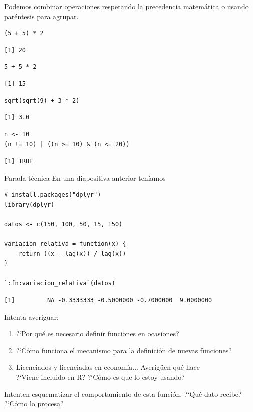 \documentclass[8pt]{beamer}
\begin{document}
\begin{frame}[fragile]
	Podemos combinar operaciones respetando la precedencia matemática o usando paréntesis para agrupar.
	
\begin{lstlisting}[style=RScript]
(5 + 5) * 2
\end{lstlisting}
\begin{lstlisting}[style=RConsole]
[1] 20
\end{lstlisting}
\begin{lstlisting}[style=RScript]
5 + 5 * 2
\end{lstlisting}
\begin{lstlisting}[style=RConsole]
[1] 15
\end{lstlisting}
\begin{lstlisting}[style=RScript]
sqrt(sqrt(9) + 3 * 2)
\end{lstlisting}
\begin{lstlisting}[style=RConsole]
[1] 3.0
\end{lstlisting}
\begin{lstlisting}[style=RScript]
n <- 10
(n != 10) | ((n >= 10) & (n <= 20))
\end{lstlisting}
\begin{lstlisting}[style=RConsole]
[1] TRUE
\end{lstlisting}
\end{frame}






	\begin{frame}[fragile]{Parada t\'ecnica}
	En una diapositiva anterior ten\'iamos	
	
\begin{lstlisting}[style=RScript]
# install.packages("dplyr")
library(dplyr)

datos <- c(150, 100, 50, 15, 150)

variacion_relativa = function(x) {
	return ((x - lag(x)) / lag(x))
}

`:fn:variacion_relativa`(datos)
\end{lstlisting}
\begin{lstlisting}[style=RConsole]
[1]         NA -0.3333333 -0.5000000 -0.7000000  9.0000000
\end{lstlisting}
	
	Intenta averiguar:
	\begin{enumerate}
		\item ?`Por qu\'e es necesario definir funciones en ocasiones?
		\item ?`C\'omo funciona el mecanismo para la definici\'on de nuevas funciones?
		\item Licenciados y licenciadas en econom\'ia... Averig\"uen qu\'e hace \\?`Viene incluido en R? ?`C\'omo es que lo estoy usando?
	\end{enumerate}
	
	Intenten esquematizar el comportamiento de esta función. ?`Qu\'e dato recibe? ?`C\'omo lo procesa?
\end{frame}
\end{document}
